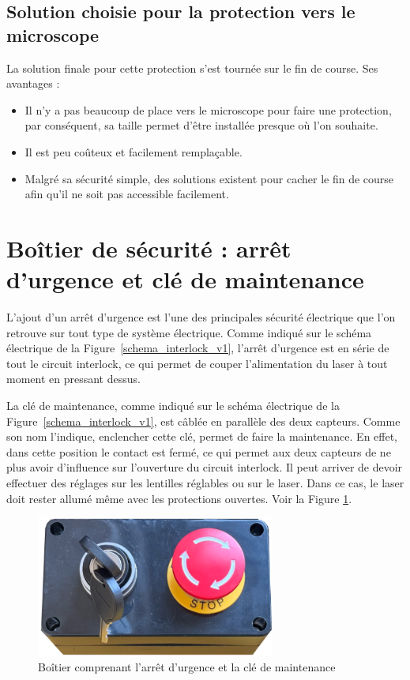 \subsection{Solution choisie pour la protection vers le microscope}
La solution finale pour cette protection s'est tournée sur le fin de course. Ses avantages :
\begin{itemize}
    \item Il n'y a pas beaucoup de place vers le microscope pour faire une protection, par conséquent, sa taille permet d'être installée presque où l'on souhaite.
    \item Il est peu coûteux et facilement remplaçable.
    \item Malgré sa sécurité simple, des solutions existent pour cacher le fin de course afin qu'il ne soit pas accessible facilement.
\end{itemize}

\section{Boîtier de sécurité : arrêt d'urgence et clé de maintenance}
\label{subsec:arret_urgence_maintenance}
L'ajout d'un arrêt d'urgence est l'une des principales sécurité électrique que l'on retrouve sur tout type de système électrique. Comme indiqué sur le schéma électrique de la Figure~\ref{schema_interlock_v1}, l'arrêt d'urgence est en série de tout le circuit interlock, ce qui permet de couper l'alimentation du laser à tout moment en pressant dessus.

La clé de maintenance, comme indiqué sur le schéma électrique de la Figure~\ref{schema_interlock_v1}, est câblée en parallèle des deux capteurs. Comme son nom l'indique, enclencher cette clé, permet de faire la maintenance. En effet, dans cette position le contact est fermé, ce qui permet aux deux capteurs de ne plus avoir d'influence sur l'ouverture du circuit interlock. Il peut arriver de devoir effectuer des réglages sur les lentilles réglables ou sur le laser. Dans ce cas, le laser doit rester allumé même avec les protections ouvertes. Voir la Figure \ref{boitier_arret_urgence_maintenance}.

\begin{figure}[H]
    \begin{center}
        \includegraphics[width=0.7\textwidth]{assets/figures/Protections_laser/Securite_electrique/boitier_arret_urgence_maintenance.png}
    \end{center}
    \caption{Boîtier comprenant l'arrêt d'urgence et la clé de maintenance}
    \label{boitier_arret_urgence_maintenance}
\end{figure}


